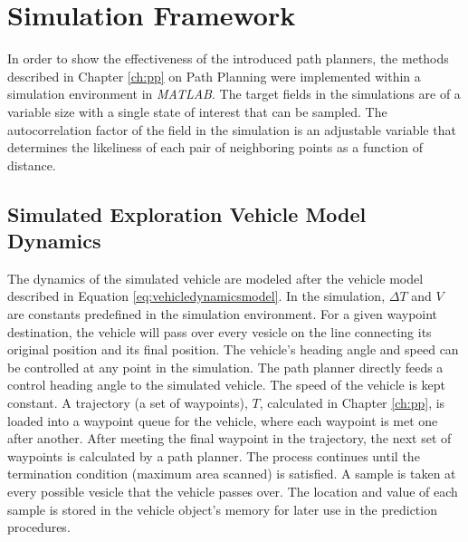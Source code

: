 \chapter{Simulation Framework}
In order to show the effectiveness of the introduced path planners, the methods described in Chapter \ref{ch:pp} on Path Planning were implemented within a simulation environment in \textit{MATLAB}. The target fields in the simulations are of a variable size with a single state of interest that can be sampled. The autocorrelation factor of the field in the simulation is an adjustable variable that determines the likeliness of each pair of neighboring points as a function of distance. 

\section{Simulated Exploration Vehicle Model Dynamics}
The dynamics of the simulated vehicle are modeled after the vehicle model described in Equation \ref{eq:vehicledynamicsmodel}. In the simulation, $\Delta T$ and $V$ are constants predefined in the simulation environment. For a given waypoint destination, the vehicle will pass over every vesicle on the line connecting its original position and its final position. The vehicle's heading angle and speed can be controlled at any point in the simulation. The path planner directly feeds a control heading angle to the simulated vehicle. The speed of the vehicle is kept constant. A trajectory (a set of waypoints), $T$, calculated in Chapter \ref{ch:pp}, is loaded into a waypoint queue for the vehicle, where each waypoint is met one after another. After meeting the final waypoint in the trajectory, the next set of waypoints is calculated by a path planner. The process continues until the termination condition (maximum area scanned) is satisfied. A sample is taken at every possible vesicle that the vehicle passes over. The location and value of each sample is stored in the vehicle object's memory for later use in the prediction procedures.



